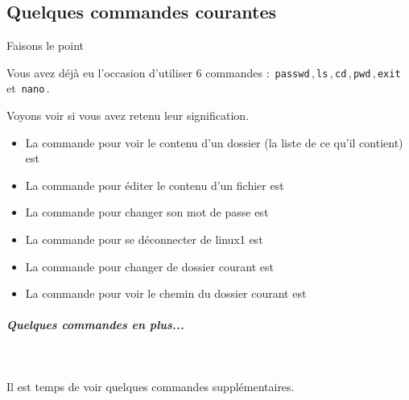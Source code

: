 \documentclass[a4paper,11pt]{article}
\begin{document}
\subsection{Quelques commandes courantes}
\begin{Exercice}{Faisons le point}		
 \textcolor{white}{.} \par
            
Vous avez d\'ej\`a eu l'occasion d'utiliser 6 commandes : \,\verb|passwd|\,,\,\verb|ls|\,,\,\verb|cd|\,,\,\verb|pwd|\,,\,\verb|exit|\, et \,\verb|nano|\,.
							
Voyons voir si vous avez retenu leur signification.
						
\begin{itemize}
\item La commande pour voir le contenu d'un dossier (la liste de ce qu'il contient) est \textcolor{gray}{\underline{\hspace*{2em}}} 
\item La commande pour \'editer le contenu d'un fichier est \textcolor{gray}{\underline{\hspace*{3em}}} 
\item La commande pour changer son mot de passe est \textcolor{gray}{\underline{\hspace*{5em}}} 
\item La commande pour se d\'econnecter de linux1 est \textcolor{gray}{\underline{\hspace*{3em}}} 
\item La commande pour changer de dossier courant est \textcolor{gray}{\underline{\hspace*{2em}}} 
\item La commande pour voir le chemin du dossier courant est \textcolor{gray}{\underline{\hspace*{2em}}} 
\end{itemize}
\end{Exercice}
				
\subparagraph{Quelques commandes en plus...} 
\textcolor{white}{.} \par
 \par
 Il est temps de voir quelques commandes suppl\'ementaires.
 \par
        
\end{document}
